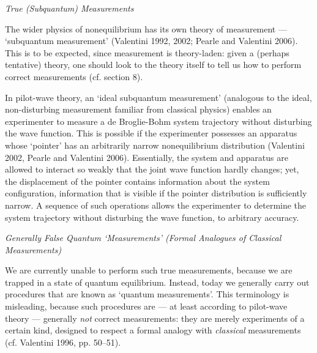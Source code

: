 \documentclass[12pt]{article}%
\begin{document}
\begin{center}
\textit{True (Subquantum) Measurements}
\end{center}

The wider physics of nonequilibrium has its own theory of measurement ---
`subquantum measurement' (Valentini 1992, 2002; Pearle and Valentini 2006).
This is to be expected, since measurement is theory-laden: given a (perhaps
tentative) theory, one should look to the theory itself to tell us how to
perform correct measurements (cf. section 8).

In pilot-wave theory, an `ideal subquantum measurement' (analogous to the
ideal, non-disturbing measurement familiar from classical physics) enables an
experimenter to measure a de Broglie-Bohm system trajectory without disturbing
the wave function. This is possible if the experimenter possesses an apparatus
whose `pointer' has an arbitrarily narrow nonequilibrium distribution
(Valentini 2002, Pearle and Valentini 2006). Essentially, the system and
apparatus are allowed to interact so weakly that the joint wave function
hardly changes; yet, the displacement of the pointer contains information
about the system configuration, information that is visible if the pointer
distribution is sufficiently narrow. A sequence of such operations allows the
experimenter to determine the system trajectory without disturbing the wave
function, to arbitrary accuracy.

\begin{center}
\textit{Generally False Quantum `Measurements' (Formal Analogues of Classical
Measurements)}
\end{center}

We are currently unable to perform such true measurements, because we are
trapped in a state of quantum equilibrium. Instead, today we generally carry
out procedures that are known as `quantum measurements'. This terminology is
misleading, because such procedures are --- at least according to pilot-wave
theory --- generally \textit{not} correct measurements: they are merely
experiments of a certain kind, designed to respect a formal analogy with
\textit{classical} measurements (cf. Valentini 1996, pp. 50--51).
\end{document}
